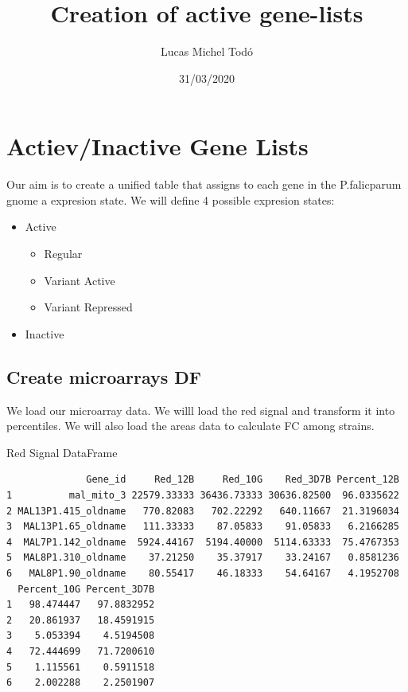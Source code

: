 \documentclass[11pt]{article}
\author{Lucas Michel Todó}
\date{31/03/2020}
\title{Creation of active gene-lists}
\begin{document}
\maketitle
\tableofcontents \clearpage
\section{Actiev/Inactive Gene Lists}
\label{sec:org750967f}
Our aim is to create a unified table that assigns to each gene in the P.falicparum gnome a expresion state.
We will define 4 possible expresion states:
\begin{itemize}
\item Active
\begin{itemize}
\item Regular
\item Variant Active
\item Variant Repressed
\end{itemize}
\item Inactive
\end{itemize}

\subsection{Create microarrays DF}
\label{sec:org4c7774d}
We load our microarray data.
We willl load the red signal and transform it into percentiles.
We will also load the areas data to calculate FC among strains.

Red Signal DataFrame
\begin{verbatim}
              Gene_id     Red_12B     Red_10G    Red_3D7B Percent_12B
1          mal_mito_3 22579.33333 36436.73333 30636.82500  96.0335622
2 MAL13P1.415_oldname   770.82083   702.22292   640.11667  21.3196034
3  MAL13P1.65_oldname   111.33333    87.05833    91.05833   6.2166285
4  MAL7P1.142_oldname  5924.44167  5194.40000  5114.63333  75.4767353
5  MAL8P1.310_oldname    37.21250    35.37917    33.24167   0.8581236
6   MAL8P1.90_oldname    80.55417    46.18333    54.64167   4.1952708
  Percent_10G Percent_3D7B
1   98.474447   97.8832952
2   20.861937   18.4591915
3    5.053394    4.5194508
4   72.444699   71.7200610
5    1.115561    0.5911518
6    2.002288    2.2501907
\end{verbatim}
\end{document}
